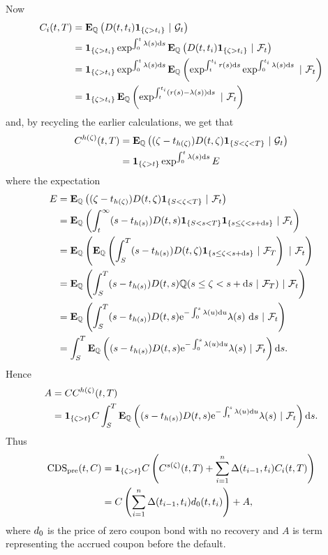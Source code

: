 Now 
	\begin{align}
	 	C_i(t,T) &= \E_{\Pm} \left( \DF(t,t_i) \1_{ \{ \default > t_i \} } \ | \ \G_t \right) \\
	 	&= \1_{ \{ \default > t_i \} } \exp^{ \int_0^t \lambda(s) \dx s } \E_{\Pm} \left( \DF(t,t_i) \1_{ \{ \default > t_i \} } \ | \ \F_t \right) \\
	 	&= \1_{ \{ \default > t_i \} } \exp^{ \int_0^t \lambda(s) \dx s } \E_{\Pm} \left( \exp^{ \int_t^{t_i} r(s) \dx s } \exp^{ \int_0^{t_i} \lambda(s) \dx s } \ | \ \F_t \right) \\
	 	&= \1_{ \{ \default > t_i \} } \E_{\Pm} \left( \exp^{ \int_t^{t_i} (r(s) - \lambda(s)) \dx s } \ | \ \F_t \right)
	\end{align}
and, by recycling the earlier calculations, we get that
	\begin{align}
C^{h(\zeta)}(t,T) &= \operatorname{\boldsymbol{\mathrm{E}}}_{\mathbb{Q}} \left( (\zeta - t_{h(\zeta)}) D(t,\zeta) \boldsymbol{1}_{ \{ S < \zeta < T \} } \ | \ \mathcal{G}_t \right) \\
	&= \boldsymbol{1}_{ \{ \zeta > t \} } \exp^{ \int_0^t \lambda(s) \mathrm{d} s } E
\end{align}
where the expectation
	\begin{align}
		E &= \operatorname{\boldsymbol{\mathrm{E}}}_{\mathbb{Q}} \left( (\zeta - t_{h(\zeta)}) D(t,\zeta) \boldsymbol{1}_{ \{ S < \zeta < T \} } \ | \ \mathcal{F}_t \right) \\
		&= \operatorname{\boldsymbol{\mathrm{E}}}_{\mathbb{Q}} \left( \int_t^{\infty} (s - t_{h(s)}) D(t,s)  \boldsymbol{1}_{ \{ S < s < T \} } \boldsymbol{1}_{ \{ s \leq \zeta < s + \mathrm{d} s \} } \ | \ \mathcal{F}_t \right)	\\	
		&= \operatorname{\boldsymbol{\mathrm{E}}}_{\mathbb{Q}} \left( \operatorname{\boldsymbol{\mathrm{E}}}_{\mathbb{Q}} \left( \int_S^T (s - t_{h(s)}) D(t,\zeta) \boldsymbol{1}_{ \{ s \leq \zeta < s + \mathrm{d} s \} } \ | \ \mathcal{F}_T \right)  \ | \ \mathcal{F}_t \right) \\
		&= \operatorname{\boldsymbol{\mathrm{E}}}_{\mathbb{Q}} \left( \int_S^T (s - t_{h(s)}) D(t,s) \mathbb{Q}( s \leq \zeta < s + \mathrm{d} s \ | \ \mathcal{F}_T )  \ | \ \mathcal{F}_t \right) \\
		&= \operatorname{\boldsymbol{\mathrm{E}}}_{\mathbb{Q}} \left( \int_S^T (s - t_{h(s)}) D(t,s) \mathrm{e}^{ -\int_0^s \lambda(u) \mathrm{d} u } \lambda(s) \ \mathrm{d} s  \ | \ \mathcal{F}_t \right) \\
		&= \int_S^T \operatorname{\boldsymbol{\mathrm{E}}}_{\mathbb{Q}} \left(  (s - t_{h(s)}) D(t,s) \mathrm{e}^{ -\int_0^s \lambda(u) \mathrm{d} u } \lambda(s)  \ | \ \mathcal{F}_t \right) \mathrm{d} s .
	\end{align}
Hence 
	\begin{align}
A &= C C^{h(\default)}(t,T) \\
&= \1_{ \{ \default > t \} } C \int_S^T \E_{\Pm} \left(  (s - t_{h(s)}) \DF(t,s) \e^{ -\int_t^s \lambda(u) \dx u } \lambda(s)  \ | \ \F_t \right) \dx s	.	
	\end{align}
Thus
\begin{align}
\operatorname{\mathrm{CDS_{pre}}}(t, C) &= \boldsymbol{1}_{ \{ \zeta > t \} } C \left( C^{s(\zeta)}(t,T) + \sum_{i=1}^n \Delta (t_{i-1}, t_i) C_i(t,T) \right) \\
	&= C \left( \sum_{i=1}^n \Delta (t_{i-1}, t_i) d_0(t,t_i) \right) + A ,
\end{align}
where $d_0$ is the price of zero coupon bond with no recovery and $A$ is term representing the accrued coupon before the default.

